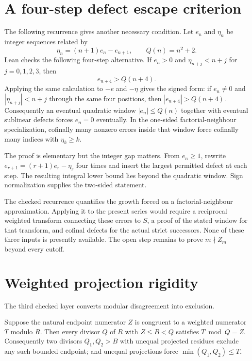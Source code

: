\documentclass[11pt]{article}
\newcommand{\Ser}{S}
\begin{document}
\section{A four-step defect escape criterion}
\label{sec:four-step-defect}

The following recurrence gives another necessary condition.  Let $e_n$ and
$\eta_n$ be integer sequences related by
\[
  \eta_n=(n+1)e_n-e_{n+1},
  \qquad Q(n)=n^2+2.
\]
Lean checks the following four-step alternative.  If $e_n>0$ and
$\eta_{n+j}<n+j$ for $j=0,1,2,3$, then
\[
  e_{n+4}>Q(n+4).
\]
Applying the same calculation to $-e$ and $-\eta$ gives the signed form: if
$e_n\ne0$ and $|\eta_{n+j}|<n+j$ through the same four positions, then
$|e_{n+4}|>Q(n+4)$.  Consequently an eventual quadratic window
$|e_n|\le Q(n)$ together with eventual sublinear defects forces $e_n=0$
eventually.  In the one-sided factorial-neighbour specialization, cofinally
many nonzero errors inside that window force cofinally many indices with
$\eta_k\ge k$.

The proof is elementary but the integer gap matters.  From $e_n\ge1$, rewrite
$e_{r+1}=(r+1)e_r-\eta_r$ four times and insert the largest permitted defect
at each step.  The resulting integral lower bound lies beyond the quadratic
window.  Sign normalization supplies the two-sided statement.

The checked recurrence quantifies the growth forced on a factorial-neighbour
approximation.  Applying it to the present series would require a reciprocal
weighted transform connecting these errors to $\Ser$, a proof of the stated
window for that transform, and cofinal defects for the actual strict
successors.  None of these three inputs is presently available.  The open
step remains to prove $m\nmid Z_m$ beyond every cutoff.

\section{Weighted projection rigidity}\label{sec:projection}

The third checked layer converts modular disagreement into exclusion.

\begin{theorem}\label{res:projection}
Suppose the natural endpoint numerator $Z$ is congruent to a weighted numerator
$T$ modulo $R$.  Then every divisor $Q$ of $R$ with $Z\le B<Q$ satisfies
$T\bmod Q=Z$.  Consequently two divisors $Q_1,Q_2>B$ with unequal projected
residues exclude any such bounded endpoint; and unequal projections force
$\min(Q_1,Q_2)\le T$.
\end{theorem}
\end{document}
